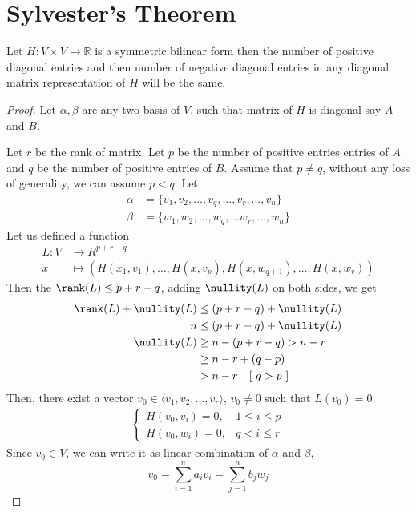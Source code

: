 \section{Sylvester's Theorem}
\begin{theorem}
Let $H:V\times V\to \mathbb{R}$ is a symmetric bilinear form then the number of positive diagonal entries and then number of negative diagonal entries in any diagonal matrix representation of $H$ will be the same.
\end{theorem}
\begin{proof}
Let $\alpha, \beta $ are any two basis of $V$, such that matrix of $H$ is diagonal say $A$ and $B.$ 

\medskip \noindent Let $r$ be the rank of matrix. Let $p$ be the number of positive entries  entries of $A$ and $q$ be the number of positive entries of $B$. Assume that $p\neq q$, without any loss of generality, we can assume $p<q$. Let
\begin{align*}
    \alpha&=\{v_1,v_2,\dots,v_q,\dots,v_r,\dots,v_n\}\\
    \beta &=\{w_1,w_2,\dots,w_q,\dots w_r,\dots,w_n\}
\end{align*}
Let us defined a function 
\begin{align*}
    L:V&\to R^{p+r-q}\\
    x&\mapsto \left (H(x_1,v_1),\dots,H(x,v_{p}),H(x,w_{q+1}),\dots, H(x,w_r)\right)
\end{align*}
Then the $\rank(L)\leq p+r-q$, adding $\nullity(L)$ on both sides, we get
\begin{align*}
    \rank(L)+\nullity(L)&\leq (p+r-q)+\nullity(L)\\ 
    n &\leq (p+r-q)+\nullity(L)\\
    \nullity(L)&\geq n-(p+r-q)>n-r\\
    &\geq n-r+(q-p) \\
    &> n-r \quad [~q>p~]
\end{align*}
Then, there exist a vector $v_{0}\in \langle v_1,v_2,\dots,v_r \rangle$, $v_0\neq 0$
such that $L(v_0)=0$
\begin{align}\label{f55.1}
    \begin{cases}
    H(v_0,v_i)=0, & 1\leq i\leq p\\
    H(v_0,w_i)=0, & q< i\leq r
    \end{cases}
\end{align}
Since $v_0\in V$, we can write it as linear combination of $\alpha$ and $\beta$,
$$v_0=\sum_{i=1}^{n}a_{i}v_{i}=\sum_{j=1}^{n}b_jw_j$$

\end{proof}
